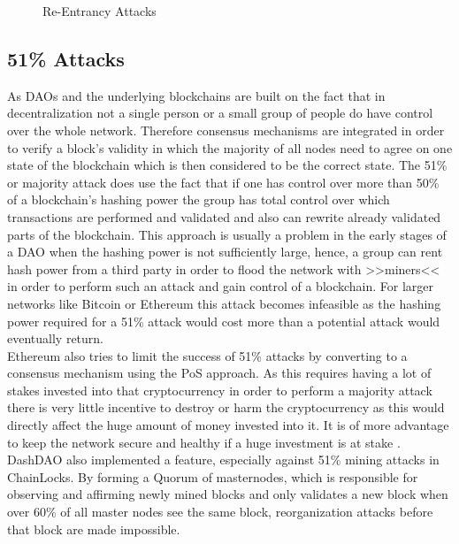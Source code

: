 \documentclass[a4paper,12pt]{report}
\begin{document}
\begin{figure}[H]
	            \caption{Re-Entrancy Attacks}
	            \label{fig:reentrance}
	        \end{figure}
	    \closesection
	    \subsection{51\% Attacks}
	    \startsubsection
	        As DAOs and the underlying blockchains are built on the fact that in decentralization not a single person or a small group of people do have control over the whole network. Therefore consensus mechanisms are integrated in order to verify a block's validity in which the majority of all nodes need to agree on one state of the blockchain which is then considered to be the correct state. The 51\% or majority attack does use the fact that if one has control over more than 50\% of a blockchain's hashing power the group has total control over which transactions are performed and validated and also can rewrite already validated parts of the blockchain. This approach is usually a problem in the early stages of a DAO when the hashing power is not sufficiently large, hence, a group can rent hash power from a third party in order to flood the network with >>miners<< in order to perform such an attack and gain control of a blockchain. For larger networks like Bitcoin or Ethereum this attack becomes infeasible as the hashing power required for a 51\% attack would cost more than a potential attack would eventually return. \\
	        Ethereum also tries to limit the success of 51\% attacks by converting to a consensus mechanism using the PoS approach. As this requires having a lot of stakes invested into that cryptocurrency in order to perform a majority attack there is very little incentive to destroy or harm the cryptocurrency as this would directly affect the huge amount of money invested into it. It is of more advantage to keep the network secure and healthy if a huge investment is at stake \parencite{EthDocs}. \\
	        DashDAO also implemented a feature, especially against 51\% mining attacks in ChainLocks. By forming a Quorum of masternodes, which is responsible for observing and affirming newly mined blocks and only validates a new block when over 60\% of all master nodes see the same block, reorganization attacks before that block are made impossible.
	    \closesection
\end{document}
